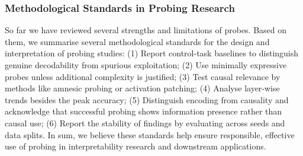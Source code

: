 \subsubsection{Methodological Standards in Probing Research}
So far we have reviewed several strengths and limitations of probes. Based on them, we summarise several methodological standards for the design and interpretation of probing studies: (1) Report control-task baselines to distinguish genuine decodability from spurious exploitation; (2) Use minimally expressive probes unless additional complexity is justified; (3) Test causal relevance by methods like amnesic probing or activation patching; (4) Analyse layer-wise trends besides the peak accuracy; (5) Distinguish encoding from causality and acknowledge that successful probing shows information presence rather than causal use; (6) Report the stability of findings by evaluating across seeds and data splits. In sum, we believe these standards help ensure responsible, effective use of probing in interpretability research and downstream applications.




